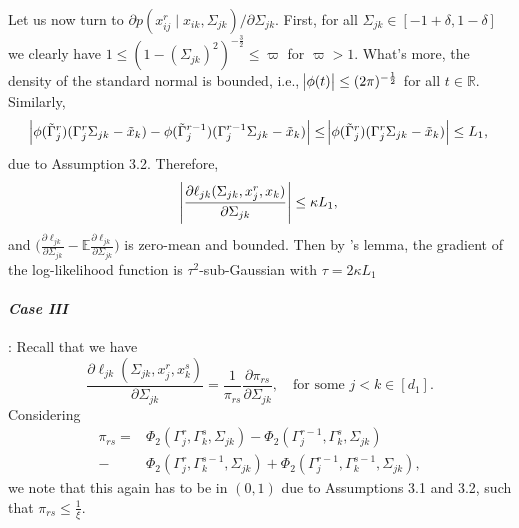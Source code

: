 \begin{condition}
    Let us now turn to $\partial p(x_{ij}^{r} \mid x_{ik}, \Sigma_{jk})/\partial \Sigma_{jk}$. First, for all $\Sigma_{jk} \in [-1+\delta, 1-\delta]$ we clearly have $1 \leq (1-(\Sigma_{jk})^2)^{-\frac{3}{2}} \leq \varpi$ for $\varpi > 1$. What's more, the density of the standard normal is bounded, i.e., $\abs{\phi(t)} \leq (2\pi)^{-\frac{1}{2}}$ for all $t \in \mathbb{R}$. Similarly,
    \begin{equation*}
        \abs{\phi({\tilde{\Gamma}}_j^{r})({\Gamma}_j^r\Sigma_{jk} - {\tilde{x}}_{k}) - \phi({\tilde{\Gamma}}_j^{r-1})({\Gamma}_j^{r-1}\Sigma_{jk} - {\tilde{x}}_{k})} \leq  \abs{\phi({\tilde{\Gamma}}_j^{r})({\Gamma}_j^r\Sigma_{jk} - {\tilde{x}}_{k})} \leq L_1,
    \end{equation*}
    due to Assumption 3.2. %
    Therefore,
    \begin{equation*}
        \abs{\frac{\partial\ell_{jk}(\Sigma_{jk}, x_j^r,x_k)}{\partial \Sigma_{jk}}} \leq \kappa L_1,
    \end{equation*}
    and $\Big(\frac{\partial\ell_{jk}}{\partial \Sigma_{jk}} - \mathbb{E}\frac{\partial\ell_{jk}}{\partial \Sigma_{jk}} \Big)$ is zero-mean and bounded. Then by  \citeauthor{Hoeffding63}'s \cite{Hoeffding63} lemma, the gradient of the log-likelihood function is $\tau^2$-sub-Gaussian with $\tau = 2\kappa L_1$

    \paragraph{\textit{Case III}}: Recall that we have
    \begin{equation*}
        \frac{\partial \ell_{jk}(\Sigma_{jk}, x_j^r,x_k^s)}{\partial \Sigma_{jk}} = \frac{1}{\pi_{rs}} \frac{\partial \pi_{rs}}{\partial \Sigma_{jk}}, \quad \text{for some }j<k \in [d_1].
    \end{equation*}
    Considering
    \begin{align*}
        \pi_{rs} = & \Phi_2({\Gamma}_j^r, {\Gamma}_k^s, \Sigma_{jk}) - \Phi_2({\Gamma}_j^{r-1}, {\Gamma}_k^s, \Sigma_{jk})          \\
        -          & \Phi_2({\Gamma}_j^r, {\Gamma}_k^{s-1}, \Sigma_{jk}) + \Phi_2({\Gamma}_j^{r-1}, {\Gamma}_k^{s-1}, \Sigma_{jk}),
    \end{align*}
    we note that this again has to be in $(0,1)$ due to Assumptions 3.1 and 3.2,
    such that $\pi_{rs} \leq \frac{1}{\xi}$. %


\end{condition}
